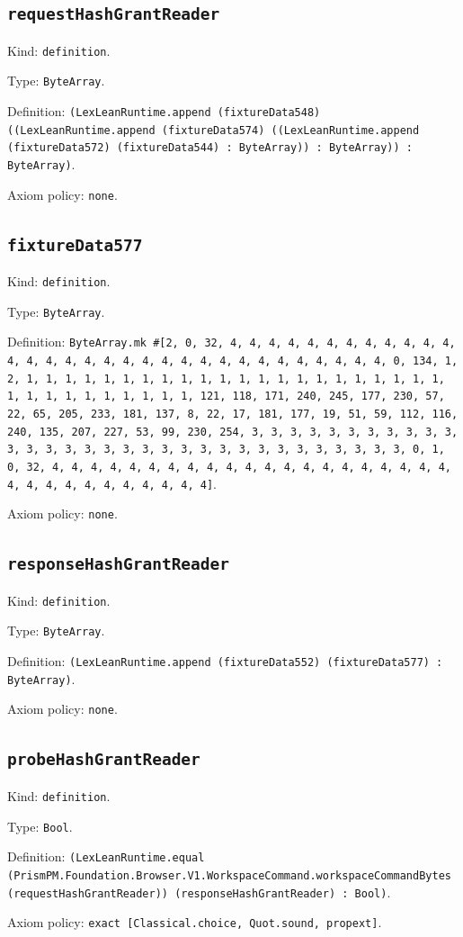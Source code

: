 \documentclass[11pt]{article}
\begin{document}
\subsection*{\texttt{requestHashGrantReader}}
\noindent Kind: \texttt{definition}.\par
\noindent Type: \texttt{ByteArray}.\par
\noindent Definition: \texttt{(LexLeanRuntime.append (fixtureData548) ((LexLeanRuntime.append (fixtureData574) ((LexLeanRuntime.append (fixtureData572) (fixtureData544) : ByteArray)) : ByteArray)) : ByteArray)}.\par
\noindent Axiom policy: \texttt{none}.\par
\subsection*{\texttt{fixtureData577}}
\noindent Kind: \texttt{definition}.\par
\noindent Type: \texttt{ByteArray}.\par
\noindent Definition: \texttt{ByteArray.mk \#[2, 0, 32, 4, 4, 4, 4, 4, 4, 4, 4, 4, 4, 4, 4, 4, 4, 4, 4, 4, 4, 4, 4, 4, 4, 4, 4, 4, 4, 4, 4, 4, 4, 4, 4, 0, 134, 1, 2, 1, 1, 1, 1, 1, 1, 1, 1, 1, 1, 1, 1, 1, 1, 1, 1, 1, 1, 1, 1, 1, 1, 1, 1, 1, 1, 1, 1, 1, 1, 1, 1, 121, 118, 171, 240, 245, 177, 230, 57, 22, 65, 205, 233, 181, 137, 8, 22, 17, 181, 177, 19, 51, 59, 112, 116, 240, 135, 207, 227, 53, 99, 230, 254, 3, 3, 3, 3, 3, 3, 3, 3, 3, 3, 3, 3, 3, 3, 3, 3, 3, 3, 3, 3, 3, 3, 3, 3, 3, 3, 3, 3, 3, 3, 3, 3, 0, 1, 0, 32, 4, 4, 4, 4, 4, 4, 4, 4, 4, 4, 4, 4, 4, 4, 4, 4, 4, 4, 4, 4, 4, 4, 4, 4, 4, 4, 4, 4, 4, 4, 4, 4]}.\par
\noindent Axiom policy: \texttt{none}.\par
\subsection*{\texttt{responseHashGrantReader}}
\noindent Kind: \texttt{definition}.\par
\noindent Type: \texttt{ByteArray}.\par
\noindent Definition: \texttt{(LexLeanRuntime.append (fixtureData552) (fixtureData577) : ByteArray)}.\par
\noindent Axiom policy: \texttt{none}.\par
\subsection*{\texttt{probeHashGrantReader}}
\noindent Kind: \texttt{definition}.\par
\noindent Type: \texttt{Bool}.\par
\noindent Definition: \texttt{(LexLeanRuntime.equal (PrismPM.Foundation.Browser.V1.WorkspaceCommand.workspaceCommandBytes (requestHashGrantReader)) (responseHashGrantReader) : Bool)}.\par
\noindent Axiom policy: \texttt{exact [Classical.choice, Quot.sound, propext]}.\par
\end{document}
